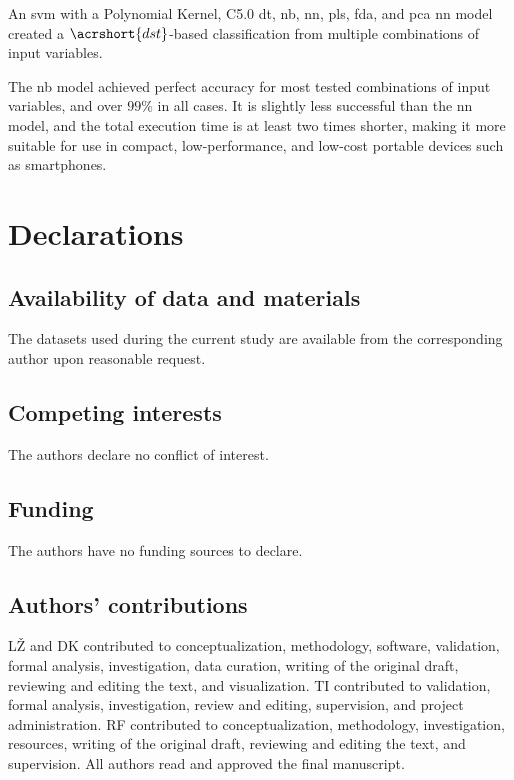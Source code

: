 \documentclass[sn-mathphys-num]{sn-jnl}%
\begin{document}
An \acrfull{svm} with a Polynomial Kernel, C5.0 \acrfull{dt}, \acrfull{nb}, \acrfull{nn}, \acrfull{pls}, \acrfull{fda}, and \acrfull{pca} \acrshort{nn} model created a $\acrshort{dst}$-based classification from multiple combinations of input variables.

The \acrshort{nb} model achieved perfect accuracy for most tested combinations of input variables, and over $99\%$ in all cases. It is slightly less successful than the \acrshort{nn} model, and the total execution time is at least two times shorter, making it more suitable for use in compact, low-performance, and low-cost portable devices such as smartphones.

\clearpage

\printglossary[type=\acronymtype]

\section{Declarations}

\subsection{Availability of data and materials}

The datasets used during the current study are available from the corresponding author upon reasonable request.

\subsection{Competing interests}

The authors declare no conflict of interest.

\subsection{Funding}

The authors have no funding sources to declare.

\subsection{Authors' contributions}

L\v{Z} and DK contributed to conceptualization, methodology, software, validation, formal analysis, investigation, data curation, writing of the original draft, reviewing and editing the text, and visualization. TI contributed to validation, formal analysis, investigation, review and editing, supervision, and project administration. RF contributed to conceptualization, methodology, investigation, resources, writing of the original draft, reviewing and editing the text, and supervision. All authors read and approved the final manuscript.
\end{document}
